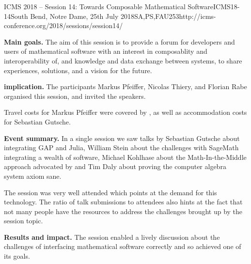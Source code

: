 \begin{event}{ICMS 2018 -- Session 14: Towards Composable Mathematical Software}{ICMS18-14}{South Bend, Notre Dame, 25th July 2018}{SA,PS,FAU}{25}{3}{http://icms-conference.org/2018/sessions/session14/}

\textbf{Main goals.} The aim of this session is to provide a forum for
developers and users of mathematical software with an interest in composablity
and interoperability of, and knowledge and data exchange between systems, to
share experiences, solutions, and a vision for the future.

\textbf{\ODK implication.} The \ODK participants Markus Pfeiffer, Nicolas Thiery,
and Florian Rabe organised this session, and invited the speakers.

Travel costs for Markus Pfeiffer were covered by \ODK, as well as accommodation
costs for Sebastian Gutsche.

\textbf{Event summary.} In a single session we saw talks by Sebastian Gutsche
about integrating GAP and Julia, William Stein about the challenges with
SageMath integrating a wealth of software, Michael Kohlhase about the
Math-In-the-Middle approach advocated by \ODK and Tim Daly about proving the
computer algebra system axiom sane.

The session was very well attended which points at the demand for this
technology. The ratio of talk submissions to attendees also hints at the fact
that not many people have the resources to address the challenges brought up by
the session topic.

\textbf{Results and impact.} The session enabled a lively discussion about the
challenges of interfacing mathematical software correctly and so achieved one of
its goals.

\end{event}
